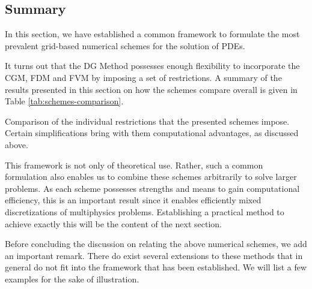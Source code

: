 \documentclass[asi,article,submit,moreauthors]{Definitions/mdpi}
\begin{document}
\subsection{Summary}

In this section, we have established a common framework to formulate the most prevalent grid-based numerical schemes for the solution of PDEs.

It turns out that the DG Method possesses enough flexibility to incorporate the CGM, FDM and FVM by imposing a set of restrictions.
A summary of the results presented in this section on how the schemes compare overall is given in Table \ref{tab:schemes-comparison}.

\begin{table}
    \centering
    \caption{Comparison of the individual restrictions that the presented schemes impose. Certain simplifications bring with them computational advantages, as discussed above.}
    \label{tab:schemes-comparison}
\end{table}

This framework is not only of theoretical use.
Rather, such a common formulation also enables us to combine these schemes arbitrarily to solve larger problems.
As each scheme possesses strengths and means to gain computational efficiency, this is an important result since it enables efficiently mixed discretizations of multiphysics problems.
Establishing a practical method to achieve exactly this will be the content of the next section.

Before concluding the discussion on relating the above numerical schemes, we add an important remark.
There do exist several extensions to these methods that in general do not fit into the framework that has been established.
We will list a few examples for the sake of illustration.
\end{document}
